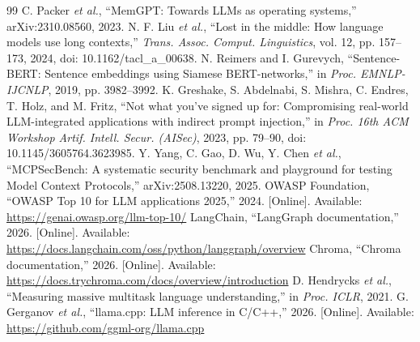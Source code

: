 \begin{thebibliography}{99}
 C. Packer \textit{et al.}, ``MemGPT: Towards LLMs as operating systems,'' arXiv:2310.08560, 2023.
 N. F. Liu \textit{et al.}, ``Lost in the middle: How language models use long contexts,'' \textit{Trans. Assoc. Comput. Linguistics}, vol. 12, pp. 157--173, 2024, doi: 10.1162/tacl\_a\_00638.
 N. Reimers and I. Gurevych, ``Sentence-BERT: Sentence embeddings using Siamese BERT-networks,'' in \textit{Proc. EMNLP-IJCNLP}, 2019, pp. 3982--3992.
 K. Greshake, S. Abdelnabi, S. Mishra, C. Endres, T. Holz, and M. Fritz, ``Not what you've signed up for: Compromising real-world LLM-integrated applications with indirect prompt injection,'' in \textit{Proc. 16th ACM Workshop Artif. Intell. Secur. (AISec)}, 2023, pp. 79--90, doi: 10.1145/3605764.3623985.
 Y. Yang, C. Gao, D. Wu, Y. Chen \textit{et al.}, ``MCPSecBench: A systematic security benchmark and playground for testing Model Context Protocols,'' arXiv:2508.13220, 2025.
 OWASP Foundation, ``OWASP Top 10 for LLM applications 2025,'' 2024. [Online]. Available: \url{https://genai.owasp.org/llm-top-10/}
 LangChain, ``LangGraph documentation,'' 2026. [Online]. Available: \url{https://docs.langchain.com/oss/python/langgraph/overview}
 Chroma, ``Chroma documentation,'' 2026. [Online]. Available: \url{https://docs.trychroma.com/docs/overview/introduction}
 D. Hendrycks \textit{et al.}, ``Measuring massive multitask language understanding,'' in \textit{Proc. ICLR}, 2021.
 G. Gerganov \textit{et al.}, ``llama.cpp: LLM inference in C/C++,'' 2026. [Online]. Available: \url{https://github.com/ggml-org/llama.cpp}
\end{thebibliography}
